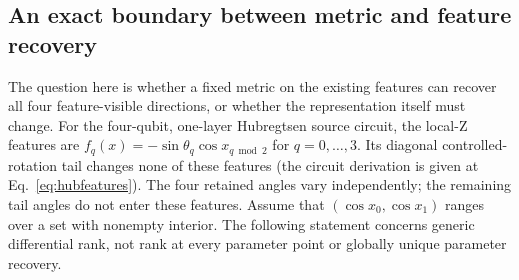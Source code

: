 \subsection{An exact boundary between metric and feature recovery}
The question here is whether a fixed metric on the existing features
can recover all four feature-visible directions, or whether the
representation itself must change.
For the four-qubit, one-layer Hubregtsen source circuit, the local-Z
features are $f_q(x)=-\sin\theta_q\cos x_{q\bmod2}$ for $q=0,\ldots,3$.
Its diagonal controlled-rotation tail changes none of these features
(the circuit derivation is given at Eq.~\eqref{eq:hubfeatures}).
The four retained angles vary independently; the remaining tail
angles do not enter these features. Assume that
$(\cos x_0,\cos x_1)$ ranges over a set with nonempty interior.
The following statement concerns generic differential rank, not
rank at every parameter point or globally unique parameter recovery.

